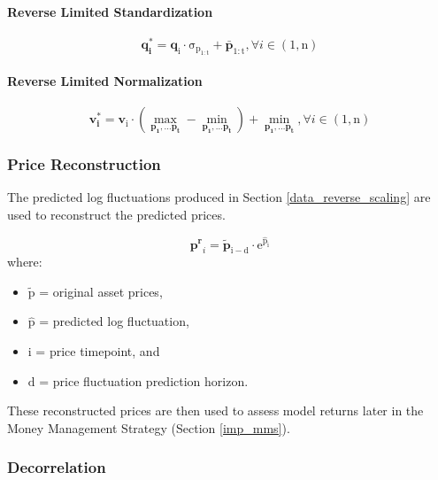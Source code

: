 \documentclass[a4paper,11pt,oneside]{article}
\theoremstyle{plain}
\theoremstyle{definition}
\begin{document}
	\paragraph{Reverse Limited Standardization}
	
	\begin{equation}
	\mathbf{q^{*}_i} = \mathrm{{\mathbf{q}_i} \cdot \sigma_{p_{1:t}} + \bar{\mathbf{p}}_{1:t}},  \forall  i \in (1, \mathrm{n})
	\end{equation}
	
	\paragraph{Reverse Limited Normalization}
	
	\begin{equation}
	\mathbf{v^{*}_i} = \mathrm{\mathbf{v}_i \cdot \left(\max\limits_{\mathbf{p_1},\dots\mathbf{p_t}} - \min\limits_{\mathbf{p_1},\dots\mathbf{p_t}}\right) + \min\limits_{\mathbf{p_1},\dots\mathbf{p_t}}},  \forall  i \in (1, \mathrm{n})
	\end{equation}
	
	
	\subsubsection{Price Reconstruction}\label{data_price_recon}
	
	The predicted log fluctuations produced in Section \ref{data_reverse_scaling} are used to reconstruct the predicted prices. 
	
	\begin{equation}\label{eq_price_recon}
	\mathbf{p^r}_{i} = \mathrm{\tilde{\mathbf{p}}_{i-d} \cdot e^{\hat{p}_{i}}}
	\end{equation}
	where:
	\begin{itemize}
		\item [] $\mathrm{\tilde{p}}$ = original asset prices,
		\item [] $\mathrm{\hat{p}}$ = predicted log fluctuation,
		\item [] $\mathrm{i}$ = price timepoint, and 
		\item [] $\mathrm{d}$ = price fluctuation prediction horizon.
		
	\end{itemize}
	\texttt{}\newline
	These reconstructed prices are then used to assess model returns later in the Money Management Strategy (Section \ref{imp_mms}).
	
	\subsubsection{Decorrelation}
	
\end{document}
